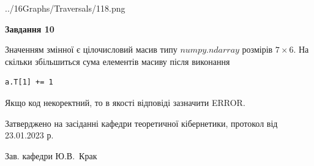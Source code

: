 \documentclass[12pt, ukrainian]{article}
\begin{document}
{\begin {large}
\begin{center}
	{../16Graphs/Traversals/118.png}
\end{center}\par
\newpage

{\begin {center}\textbf{Завдання 10}\end {center}}\par
Значенням змінної  є цілочисловий масив типу $numpy.ndarray$ розмірів $7{\times}6$. На скільки збільшиться сума елементів масиву  після виконання
\begin{verbatim}
a.T[1] += 1
\end{verbatim}


Якщо код некоректний, то в якості відповіді зазначити ERROR.\par
\newpage


\end {large}
}
{\smallskip \begin {small} Затверджено на засіданні кафедри теоретичної кібернетики, протокол  від   23.01.2023 р.\par\smallskip\smallskip
{\parbox {6.5 cm}{Зав. кафедри \dotfill Ю.В.~Крак}} \end{small}}
\end{document}
